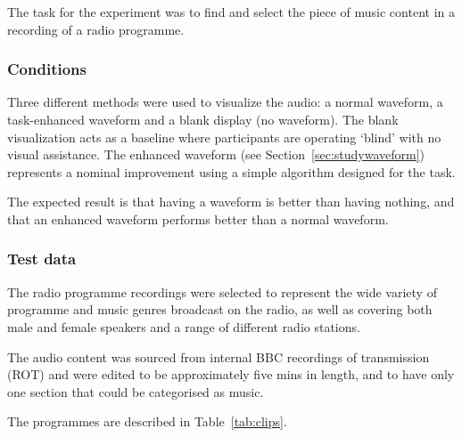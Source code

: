 The task for the experiment was to find and select the piece of music content
in a recording of a radio programme.

\subsubsection{Conditions}
Three different methods were used to visualize the audio: a normal waveform, a
task-enhanced waveform and a blank display (no waveform). The blank
visualization acts as a baseline where participants are operating `blind' with
no visual assistance. The enhanced waveform (see
Section~\ref{sec:studywaveform}) represents a nominal improvement using a
simple algorithm designed for the task.

The expected result is that having a waveform is better than having nothing,
and that an enhanced waveform performs better than a normal waveform.

\subsubsection{Test data}
The radio programme recordings were selected to represent the wide variety of
programme and music genres broadcast on the radio, as well as covering both
male and female speakers and a range of different radio stations.

The audio content was sourced from internal BBC recordings of transmission
(ROT) and were edited to be approximately five mins in length, and to have only
one section that could be categorised as music.

The programmes are described in Table~\ref{tab:clips}.

